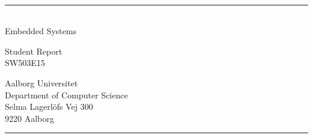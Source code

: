 \begin{titlepage}
    \addtolength{\hoffset}{0.5\evensidemargin-0.5\oddsidemargin}
    \noindent
    \vspace{1.5cm}
    \begin{center}
        {\titlefont
            \TITLE
        }\\
        \textcolor{aaublue}{\rule{120pt}{2pt}}\\
        \vspace{10pt}
        {\subtitlefont
            Embedded Systems
        }
    \end{center}
    \vspace{4cm}
    \begin{center}
        {\subtitlefont
            Student Report
        }\\
        \vspace{10pt}
        {\subtitlefont
            SW503E15
        }
    \end{center}
    \vfill
    \noindent
\hfill
\begin{minipage}{0.5\linewidth}
    \begin{flushright}
        Aalborg Universitet\\
        Department of Computer Science\\
        Selma Lagerl{\"o}fs Vej 300\\
        9220 Aalborg
    \end{flushright}
\end{minipage}
%
\begin{minipage}{0.02\linewidth}
    \textcolor{aaublue}{\rule{1pt}{5\baselineskip}}
\end{minipage}
    \titlepagedecoration
\end{titlepage}
\clearpage 